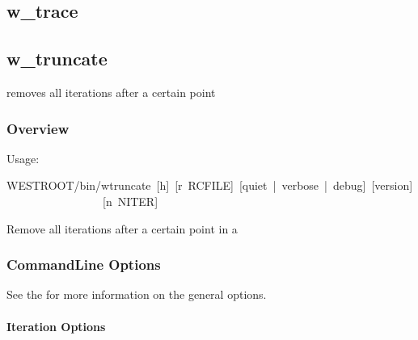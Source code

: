\documentclass[letterpaper,10pt,english]{sphinxmanual}
\begin{document}
\subsection{w\_trace}
\label{\detokenize{users_guide/command_line_tools/w_trace:w-trace}}\label{\detokenize{users_guide/command_line_tools/w_trace:id1}}\label{\detokenize{users_guide/command_line_tools/w_trace::doc}}

\subsection{w\_truncate}
\label{\detokenize{users_guide/command_line_tools/w_truncate:w-truncate}}\label{\detokenize{users_guide/command_line_tools/w_truncate:id1}}\label{\detokenize{users_guide/command_line_tools/w_truncate::doc}}
 removes all iterations after a certain point


\subsubsection{Overview}
\label{\detokenize{users_guide/command_line_tools/w_truncate:overview}}
Usage:

\begin{sphinxVerbatim}[commandchars=\\\{\}]
\PYGZdl{}WEST\PYGZus{}ROOT/bin/w\PYGZus{}truncate [\PYGZhy{}h] [\PYGZhy{}r RCFILE] [\PYGZhy{}\PYGZhy{}quiet | \PYGZhy{}\PYGZhy{}verbose | \PYGZhy{}\PYGZhy{}debug] [\PYGZhy{}\PYGZhy{}version]
                 [\PYGZhy{}n N\PYGZus{}ITER]
\end{sphinxVerbatim}

Remove all iterations after a certain point in a


\subsubsection{Command\sphinxhyphen{}Line Options}
\label{\detokenize{users_guide/command_line_tools/w_truncate:command-line-options}}
See the  for more
information on the general options.


\paragraph{Iteration Options}
\label{\detokenize{users_guide/command_line_tools/w_truncate:iteration-options}}
\begin{sphinxVerbatim}[commandchars=\\\{\}]
   
       
\end{sphinxVerbatim}
\end{document}
